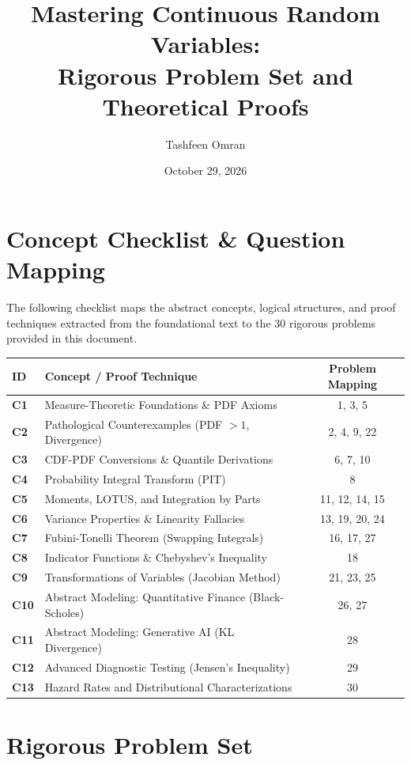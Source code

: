 \documentclass[11pt, a4paper]{article}
\title{\textbf{Mastering Continuous Random Variables:\\Rigorous Problem Set and Theoretical Proofs}}
\author{Tashfeen Omran}
\date{October 29, 2026}
\theoremstyle{definition}
\theoremstyle{remark}
\begin{document}
\maketitle
\tableofcontents
\newpage

\section{Concept Checklist \& Question Mapping}
\label{sec:checklist_start}

The following checklist maps the abstract concepts, logical structures, and proof techniques extracted from the foundational text to the 30 rigorous problems provided in this document.

\renewcommand{\arraystretch}{1.5}
\noindent
\begin{tabularx}{\textwidth}{>{\bfseries}l X c}
\toprule
ID & Concept / Proof Technique & Problem Mapping \\
\midrule
C1 & Measure-Theoretic Foundations \& PDF Axioms & 1, 3, 5 \\
C2 & Pathological Counterexamples (PDF $> 1$, Divergence) & 2, 4, 9, 22 \\
C3 & CDF-PDF Conversions \& Quantile Derivations & 6, 7, 10 \\
C4 & Probability Integral Transform (PIT) & 8 \\
C5 & Moments, LOTUS, and Integration by Parts & 11, 12, 14, 15 \\
C6 & Variance Properties \& Linearity Fallacies & 13, 19, 20, 24 \\
C7 & Fubini-Tonelli Theorem (Swapping Integrals) & 16, 17, 27 \\
C8 & Indicator Functions \& Chebyshev's Inequality & 18 \\
C9 & Transformations of Variables (Jacobian Method) & 21, 23, 25 \\
C10 & Abstract Modeling: Quantitative Finance (Black-Scholes) & 26, 27 \\
C11 & Abstract Modeling: Generative AI (KL Divergence) & 28 \\
C12 & Advanced Diagnostic Testing (Jensen's Inequality) & 29 \\
C13 & Hazard Rates and Distributional Characterizations & 30 \\
\bottomrule
\end{tabularx}

\newpage

\section{Rigorous Problem Set}
\end{document}
